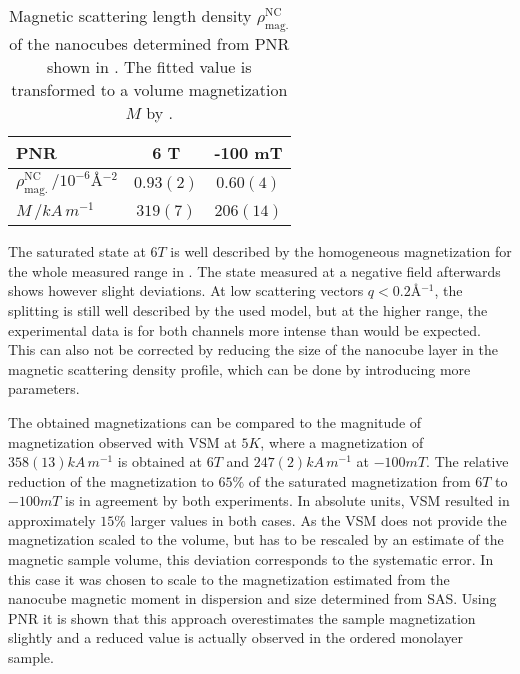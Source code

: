 \documentclass[\main/dresen_thesis.tex]{subfiles}
\begin{document}
  \begin{table}[!htbp]
    \centering
    \caption{\label{tab:monolayers:magneticStructure:pnrResult}Magnetic scattering length density $\rho_\mathrm{mag.}^\mathrm{NC}$ of the nanocubes determined from PNR shown in . The fitted value is transformed to a volume magnetization $M$ by .}
    \begin{tabular}{l | c | c}
      \hline
      PNR & \textbf{6 T} & \textbf{-100 mT}\\
      \hline
      $\rho_\mathrm{mag.}^\mathrm{NC}\, / \unit{10^{-6} \angstrom^{-2}}$ & $0.93(2)$  & $0.60(4)$  \\
      \hline
      $M \, / \unit{kA \, m^{-1}}$                                       & $319(7)$   & $206(14)$  \\
      \hline
      \end{tabular}
  \end{table}

  The saturated state at $6 \unit{T}$ is well described by the homogeneous magnetization for the whole measured range in .
  The state measured at a negative field afterwards shows however slight deviations.
  At low scattering vectors $q < 0.2 \unit{\angstrom^{-1}}$, the splitting is still well described by the used model, but at the higher range, the experimental data is for both channels more intense than would be expected.
  This can also not be corrected by reducing the size of the nanocube layer in the magnetic scattering density profile, which can be done by introducing more parameters.

  The obtained magnetizations can be compared to the magnitude of magnetization observed with VSM at $5 \unit{K}$, where a magnetization of $358(13) \unit{kA \, m^{-1}}$ is obtained at $6 \unit{T}$ and $247(2) \unit{kA \, m^{-1}}$ at $-100 \unit{mT}$.
  The relative reduction of the magnetization to $65 \%$ of the saturated magnetization from $6 \unit{T}$ to $-100 \unit{mT}$ is in agreement by both experiments.
  In absolute units, VSM resulted in approximately $15 \%$ larger values in both cases.
  As the VSM does not provide the magnetization scaled to the volume, but has to be rescaled by an estimate of the magnetic sample volume, this deviation corresponds to the systematic error.
  In this case it was chosen to scale to the magnetization estimated from the nanocube magnetic moment in dispersion and size determined from SAS.
  Using PNR it is shown that this approach overestimates the sample magnetization slightly and a reduced value is actually observed in the ordered monolayer sample.
\end{document}
